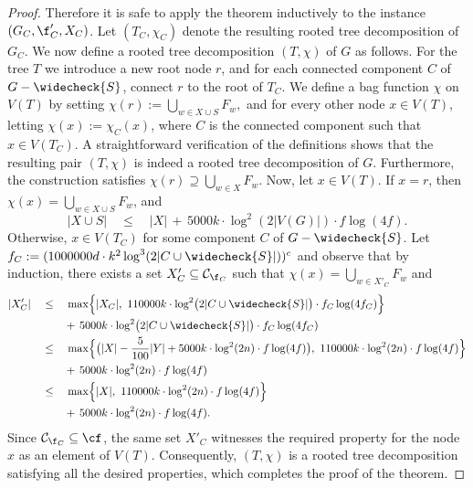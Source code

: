 \begin{proof}
    Therefore it is safe to apply the theorem inductively to the instance $(G_C, \f'_C, X_C)$. Let $(T_C,\chi_C)$ denote the resulting rooted tree decomposition of $G_C$. We now define a rooted tree decomposition $(T,\chi)$ of $G$ as follows. For the tree $T$ we introduce a new root node $r$, and for each connected component $C$ of $G - \widecheck{S}$, connect $r$ to the root of $T_C$. We define a bag function $\chi$ on $V(T)$ by setting $\chi(r) := \bigcup_{w \in X \cup S} F_w,$ and for every other node $x \in V(T)$, letting $\chi(x) := \chi_C(x)$, where $C$ is the connected component such that $x\in V(T_C)$. 
    A straightforward verification of the definitions shows that the resulting pair $(T,\chi)$ is indeed a rooted tree decomposition of $G$. Furthermore, the construction satisfies $\chi(r) \supseteq \bigcup_{w \in X} F_w$. Now, let $x \in V(T)$. If $x = r$, then $\chi(x) = \bigcup_{w \in X \cup S} F_w$, and 
    $$
    |X \cup S|\quad \leq\quad |X|\, +\, 5000k \cdot \log^2(2|V(G)|) \cdot f \log (4f).
    $$
    Otherwise, $x \in V(T_C)$ for some component $C$ of $G - \widecheck{S}$. Let $f_C := (1000000d\cdot k^2 \log^3 (2|C \cup \widecheck{S}|))^{c}$ and observe that by induction, there exists a set $X'_C \subseteq \mathcal{C}_{\f_C}$ such that $\chi(x) = \bigcup_{w \in X'_C} F_w$ and
    \begin{align*}
        |X'_C| \quad 
        &\leq \quad \max\Bigl\{ |X_C|,\ 110000k \cdot \log^2 \bigl(2|C \cup \widecheck{S}|\bigr)\cdot f_C \log (4f_C) \Bigr\} \\
        &\qquad +\, 5000k \cdot \log^2 \bigl(2|C \cup \widecheck{S}|\bigr)\cdot f_C \log (4f_C) \\
        &\leq \quad \max\Bigl\{ \bigl(|X| - \frac{5}{100}|Y| + 5000k \cdot \log^2(2n)\cdot f \log (4f)\bigr),\ 110000k \cdot \log^2(2n)\cdot f \log (4f)\Bigr\} \\
        &\qquad +\, 5000k \cdot \log^2(2n)\cdot f \log (4f) \\
        &\leq \quad \max\Bigl\{ |X|,\ 110000k \cdot \log^2(2n)\cdot f \log (4f) \Bigr\} \\
        &\qquad +\, 5000k \cdot \log^2(2n)\cdot f \log (4f) .
    \end{align*}
    Since $\mathcal{C}_{\f_C} \subseteq \cf$, the same set $X'_C$ witnesses the required property for the node $x$ as an element of $V(T)$. Consequently, $(T,\chi)$ is a rooted tree decomposition satisfying all the desired properties, which completes the proof of the theorem.
\end{proof}



